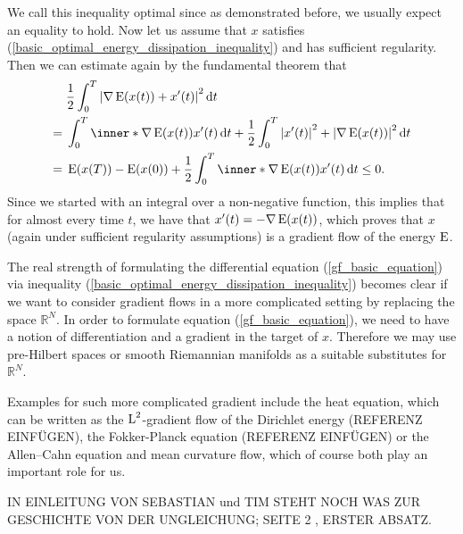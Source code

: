 We call this inequality optimal since as demonstrated before, we usually expect an equality to hold.
Now let us assume that $ x $ satisfies (\ref{basic_optimal_energy_dissipation_inequality}) and has sufficient regularity.
Then we can estimate again by the fundamental theorem that
\begin{align*}
	& \frac{ 1 }{ 2 }
	\int_{ 0 }^{ T }
		\abs{
			\nabla \energy ( x ( t ) )
			+
			x' ( t ) 
		}^{ 2 }
	\dd{ t }
	\\
	={} &
	\int_{ 0 }^{ T }
		\inner*{ \nabla \energy ( x ( t ) ) }{ x' ( t ) }
	\dd{ t }
	+
	\frac{ 1 }{ 2 }
	\int_{ 0 }^{ T }
		\abs{ x' ( t ) }^{ 2 }
		+
		\abs{ \nabla \energy ( x ( t ) ) }^{ 2 }
	\dd{ t }
	\\
	={} &
	\energy ( x ( T ) ) - \energy ( x ( 0 ) ) 
	+
	\frac{ 1 }{ 2 }
	\int_{ 0 }^{ T }
		\inner*{ \nabla \energy ( x ( t ) ) }{ x' ( t ) }
	\dd{ t }
	\leq 0.
\end{align*}
Since we started with an integral over a non-negative function, this implies that for almost every time $ t $, we have that $ x' ( t ) = - \nabla \operatorname{E} ( x ( t ) ) $, which proves that $ x $ (again under sufficient regularity assumptions) is a gradient flow of the energy $ \operatorname{E} $.

The real strength of formulating the differential equation (\ref{gf_basic_equation}) via inequality (\ref{basic_optimal_energy_dissipation_inequality}) becomes clear if we want to consider gradient flows in a more complicated setting by replacing the space $ \mathbb{ R }^{ N } $. In order to formulate equation (\ref{gf_basic_equation}), we need to have a notion of differentiation and a gradient in the target of $ x $. Therefore we may use pre-Hilbert spaces or smooth Riemannian manifolds as a suitable substitutes for $ \mathbb{ R }^{ N } $. 

Examples for such more complicated gradient include the heat equation, which can be written as the $ \operatorname{L}^{ 2 } $-gradient flow of the Dirichlet energy (REFERENZ EINFÜGEN), 
the Fokker-Planck equation (REFERENZ EINFÜGEN) or the Allen--Cahn equation and mean curvature flow, which of course both play an important role for us.
\begin{comment}
A first example for a generalization is therefore the heat equation $ \partial_{ t } u - \Delta u = 0 $ for some open and bounded set $ \Omega $. As our space, we shall take $ \mathrm{ H }_{ 0 }^{ 1 } ( \Omega ) $ equipped with the inner product
\begin{equation*}
	\inner*{ u }{ v }
	\coloneqq
	\int
		\inner*{ u }{ v }
	\dd{ x }.
\end{equation*}
Our energy is given by the Dirichlet functional
\begin{equation*}
	\energy ( u ) \coloneqq
	\frac{ 1 }{ 2 }
	\int
		\abs{ \nabla u }^{ 2 }
	\dd{ x }
\end{equation*}
Then we can compute that at least on $ \mathrm{ H }_{ 0 }^{ 1 } \cap \mathrm{ H }^{ 2 } ( \Omega ) $, the Fréchet derivative of $ \energy $ is given by $ \diff ( E ) ( u ) [ v ] = - \int \Delta u v \dd{ x } $.
\end{comment}

IN EINLEITUNG VON SEBASTIAN und TIM STEHT NOCH WAS ZUR GESCHICHTE VON DER 
UNGLEICHUNG; SEITE 2 , ERSTER ABSATZ.